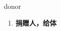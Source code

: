 
\begin{frame}
{\huge donor}
\begin{center}
\begin{enumerate}\Large
  \item \textbf{捐赠人，给体}
\end{enumerate}
\end{center}
\end{frame}
